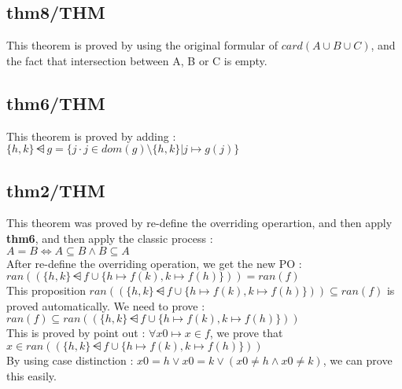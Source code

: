 \subsection{thm8/THM}
This theorem is proved by using the original formular of $card(A \cup B \cup C)$, and the fact that intersection between A, B or C is empty.

\subsection{thm6/THM}
This theorem is proved by adding : \\
$\{h, k\} \dsub g = \{j \cdot j \in dom(g) \setminus \{h,k \} | j \mapsto g(j)  \} $

\subsection{thm2/THM}
This theorem was proved by re-define the overriding operartion, and then apply \textbf{thm6}, and then apply the classic process : \\
$A = B \Leftrightarrow A \subseteq B \land B \subseteq A $ \\
After re-define the overriding operation, we get the new PO : \\
$ran((\{h,k\} \dsub f \cup \{h \mapsto f(k), k \mapsto f(h) \})) = ran(f) $\\
This proposition $ran((\{h,k\} \dsub f \cup \{h \mapsto f(k), k \mapsto f(h) \})) \subseteq ran(f) $ is proved automatically. We need to prove : \\
$ran(f) \subseteq ran((\{h,k\} \dsub f \cup \{h \mapsto f(k), k \mapsto f(h) \}))$ \\
This is proved by point out : $\forall x0 \mapsto x \in f$, we prove that $x \in ran((\{h,k\} \dsub f \cup \{h \mapsto f(k), k \mapsto f(h) \}))$ \\
By using case distinction : $x0=h \lor x0=k \lor (x0 \neq h \land x0 \neq k)$, we can prove this easily.



